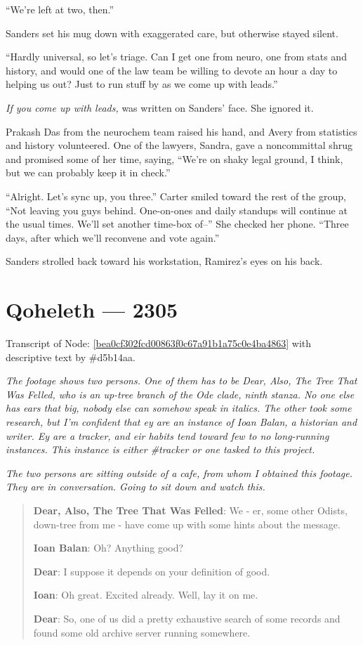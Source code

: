 ``We're left at two, then.''

Sanders set his mug down with exaggerated care, but otherwise stayed silent.

``Hardly universal, so let's triage. Can I get one from neuro, one from stats and history, and would one of the law team be willing to devote an hour a day to helping us out? Just to run stuff by as we come up with leads.''

\emph{If you come up with leads,} was written on Sanders' face. She ignored it.

Prakash Das from the neurochem team raised his hand, and Avery from statistics and history volunteered. One of the lawyers, Sandra, gave a noncommittal shrug and promised some of her time, saying, ``We're on shaky legal ground, I think, but we can probably keep it in check.''

``Alright. Let's sync up, you three.'' Carter smiled toward the rest of the group, ``Not leaving you guys behind. One-on-ones and daily standups will continue at the usual times. We'll set another time-box of--'' She checked her phone. ``Three days, after which we'll reconvene and vote again.''

Sanders strolled back toward his workstation, Ramirez's eyes on his back.

\chapter*{Qoheleth — 2305}

Transcript of Node: \href{http://35.165.134.227/node/bea0cf302fcd00863f0c67a91b1a75c0e4ba4863}{{[}bea0cf302fcd00863f0c67a91b1a75c0e4ba4863{]}} with descriptive text by \#d5b14aa.

\secdiv{}

\noindent \emph{The footage shows two persons. One of them has to be Dear, Also, The Tree That Was Felled, who is an up-tree branch of the Ode clade, ninth stanza. No one else has ears that big, nobody else can somehow speak in italics. The other took some research, but I'm confident that ey are an instance of Ioan Balan, a historian and writer. Ey are a tracker, and eir habits tend toward few to no long-running instances. This instance is either \#tracker or one tasked to this project.}

\emph{The two persons are sitting outside of a cafe, from whom I obtained this footage. They are in conversation. Going to sit down and watch this.}

\begin{quote}
\textbf{Dear, Also, The Tree That Was Felled}: We - er, some other Odists, down-tree from me - have come up with some hints about the message.

\textbf{Ioan Balan}: Oh? Anything good?

\textbf{Dear}: I suppose it depends on your definition of good.

\textbf{Ioan}: Oh great. Excited already. Well, lay it on me.

\textbf{Dear}: So, one of us did a pretty exhaustive search of some records and found some old archive server running somewhere.
\end{quote}

